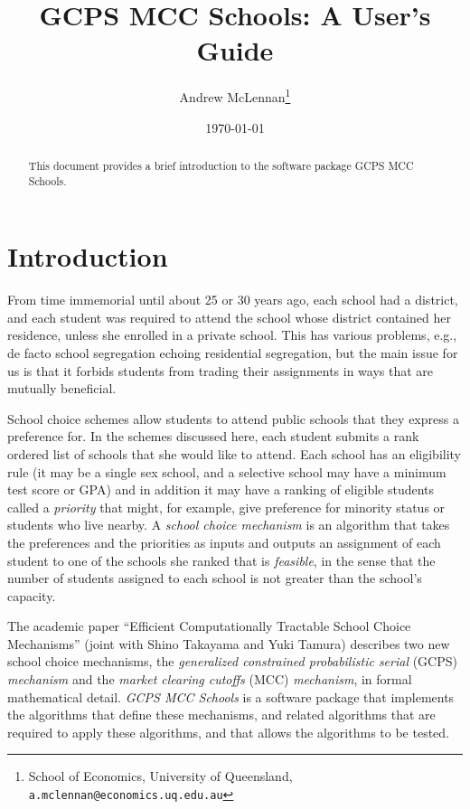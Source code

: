 \documentclass[12pt]{article}
\theoremstyle{definition}
\begin{document}
\title{GCPS MCC Schools: A User's Guide}

\author{Andrew McLennan\footnote{School of Economics, University of
    Queensland, {\tt a.mclennan@economics.uq.edu.au}}}

\date{\today}

\maketitle

\begin{abstract}
This document provides a brief introduction to the software package GCPS MCC Schools.
\end{abstract}


\section{Introduction}

From time immemorial until about 25 or 30 years ago, each school had a
district, and each student was required to attend the school whose
district contained her residence, unless she enrolled in a private
school.  This has various problems, e.g., de facto school segregation
echoing residential segregation, but the main issue for us is that it
forbids students from trading their assignments in ways that are
mutually beneficial.

School choice schemes allow students to attend public schools that
they express a preference for.  In the schemes discussed here, each
student submits a rank ordered list of schools that she would like to
attend.  Each school has an eligibility rule (it may be a single sex
school, and a selective school may have a minimum test score or GPA)
and in addition it may have a ranking of eligible students called a
\emph{priority} that might, for example, give preference for minority
status or students who live nearby.  A \emph{school choice mechanism}
is an algorithm that takes the preferences and the priorities as
inputs and outputs an assignment of each student to one of the schools
she ranked that is \emph{feasible}, in the sense that the number of
students assigned to each school is not greater than the school's
capacity.

The academic paper ``Efficient Computationally Tractable School Choice
Mechanisms'' (joint with Shino Takayama and Yuki Tamura) describes two
new school choice mechanisms, the \emph{generalized constrained
probabilistic serial} (GCPS) \emph{mechanism} and the \emph{market
clearing cutoffs} (MCC) \emph{mechanism}, in formal mathematical
detail.  \emph{GCPS MCC Schools} is a software package that implements
the algorithms that define these mechanisms, and related algorithms
that are required to apply these algorithms, and that allows the
algorithms to be tested.
\end{document}
